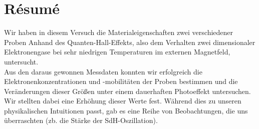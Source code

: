 \section{R\'esum\'e}
Wir haben in diesem Versuch die Materialeigenschaften zwei verschiedener Proben Anhand des Quanten-Hall-Effekts, also dem Verhalten zwei dimensionaler Elektronengase bei sehr niedrigen Temperaturen im externen Magnetfeld, untersucht. \\

Aus den daraus gewonnen Messdaten konnten wir erfolgreich die Elektronenkonzentrationen und -mobilitäten der Proben bestimmen und die Veränderungen dieser Größen unter einem dauerhaften Photoeffekt untersuchen. Wir stellten dabei eine Erhöhung dieser Werte fest. 
Während dies zu unseren physikalischen Intuitionen passt, gab es eine Reihe von Beobachtungen, die uns überraschten (zb. die Stärke der SdH-Oszillation).

